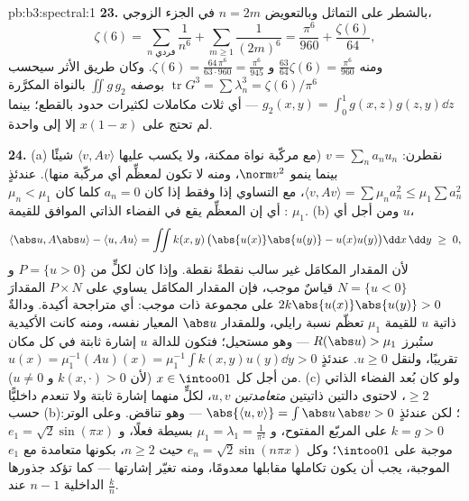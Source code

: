 \begin{solution}{pb:b3:spectral:1}
\textbf{23.} بالشطر على التماثل وبالتعويض $n = 2m$ في الجزء
الزوجي،
\[
\zeta(6) = \sum_{n\text{ فردي}}\frac1{n^6} +
\sum_{m\geq1}\frac1{(2m)^6}
= \frac{\pi^6}{960} + \frac{\zeta(6)}{64},
\]
ومنه $\frac{63}{64}\zeta(6) = \frac{\pi^6}{960}$ و $\zeta(6)
= \frac{64\,\pi^6}{63\cdot960} = \frac{\pi^6}{945}$. وكان طريق الأثر سيحسب $\operatorname{tr}G^3 =
\sum\lambda_n^3 = \zeta(6)/\pi^6$ بوصفه
$\iint g\,g_2$ بالنواة المكرَّرة $g_2(x,y) = \int_0^1g(x,z)g(z,y)\dd z$ --- أي ثلاث مكاملات
لكثيرات حدود بالقطع؛ بينما لم تحتج  على $x(1-x)$ إلا
إلى واحدة.

\textbf{24.} (a) نقطرن: $v = \sum_na_nu_n$ (مع مركّبة نواة ممكنة، ولا يكسب
عليها $\langle v, Av\rangle$ شيئًا بينما ينمو $\norm v^2$، ومنه لا تكون
لمعظِّم أي مركّبة منها). عندئذٍ $\langle v, Av\rangle = \sum\mu_na_n^2 \leq
\mu_1\sum a_n^2$، مع التساوي إذا وفقط
إذا كان $a_n = 0$ كلما كان $\mu_n < \mu_1$: أي إن المعظِّم يقع
في الفضاء الذاتي الموافق للقيمة $\mu_1$. (b) ومن أجل أي $u$،
\[
\langle\abs u, A\abs u\rangle - \langle u, Au\rangle
= \iint k(x,y)\,\bigl(\abs{u(x)}\abs{u(y)} -
u(x)u(y)\bigr)\dd x\,\dd y \;\geq\; 0,
\]
لأن المقدار المكامَل غير سالب نقطةً نقطة. وإذا كان لكلٍّ من
$P = \{u >
0\}$ و $N = \{u < 0\}$ قياسٌ موجب، فإن المقدار المكامَل يساوي
على $P\times N$ المقدارَ $2k\abs{u(x)}\abs{u(y)} >
0$ على مجموعة ذات  موجب: أي
متراجحة أكيدة. ودالةٌ ذاتية $u$ للقيمة $\mu_1$ تعظّم نسبة رايلي،
وللمقدار $\abs u$ المعيار نفسه، ومنه كانت الأكيدية ستُبرز $R(\abs u) > \mu_1$
--- وهو مستحيل؛ فتكون للدالة $u$ إشارة ثابتة في كل مكان تقريبًا،
ولنقل $u \geq 0$. عندئذٍ $u(x) = \mu_1^{-1}(Au)(x) =
\mu_1^{-1}\int k(x,y)u(y)\dd y > 0$ من أجل كل $x \in
\intoo01$ (لأن
$k(x,\cdot) > 0$ و $u \neq 0$). (c) ولو كان بُعد الفضاء الذاتي
$\geq 2$، لاحتوى دالتين ذاتيتين \emph{متعامدتين} $u, v$، لكلٍّ
منهما إشارة ثابتة ولا تنعدم داخليًّا حسب (b)؛ لكن عندئذٍ $\abs{\langle u, v\rangle} = \int\abs u\,\abs v > 0$
--- وهو تناقض. وعلى الوتر: $k = g > 0$ على المربّع المفتوح،
و $\mu_1 = \lambda_1 = \frac1{\pi^2}$ بسيطة فعلًا، و $e_1 = \sqrt2\sin(\pi x)$ موجبة على $\intoo01$؛ وكل
$e_n = \sqrt2\sin(n\pi x)$ حيث $n \geq 2$، بكونها متعامدة مع $e_1$ الموجبة، يجب أن
يكون تكاملها مقابلها معدومًا، ومنه تغيّر إشارتها --- كما تؤكد
جذورها الداخلية $n - 1$ عند $\frac kn$.


\end{solution}
